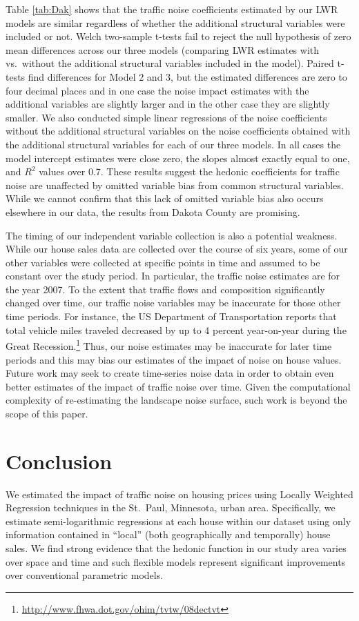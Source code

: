 \documentclass{article}\usepackage[]{graphicx}\usepackage[]{color}
\begin{document}
Table \ref{tab:Dak} shows that the traffic noise coefficients estimated by our LWR models are similar regardless of whether the additional structural variables were included or not. Welch two-sample t-tests fail to reject the null hypothesis of zero mean differences across our three models (comparing LWR estimates with vs.\ without the additional structural variables included in the model). Paired t-tests find differences for Model 2 and 3, but the estimated differences are zero to four decimal places and in one case the noise impact estimates with the additional variables are slightly larger and in the other case they are slightly smaller. We also conducted simple linear regressions of the noise coefficients without the additional structural variables on the noise coefficients obtained with the additional structural variables for each of our three models. In all cases the model intercept estimates were close zero, the slopes almost exactly equal to one, and $R^2$ values over 0.7. These results suggest the hedonic coefficients for traffic noise are unaffected by omitted variable bias from common structural variables. While we cannot confirm that this lack of omitted variable bias also occurs elsewhere in our data, the results from Dakota County are promising. 

The timing of our independent variable collection is also a potential weakness. While our house sales data are collected over the course of six years, some of our other variables were collected at specific points in time and assumed to be constant over the study period. In particular, the traffic noise estimates are for the year 2007. To the extent that traffic flows and composition significantly changed over time, our traffic noise variables may be inaccurate for those other time periods. For instance, the US Department of Transportation reports that total vehicle miles traveled decreased by up to 4 percent year-on-year during the Great Recession.\footnote{\url{http://www.fhwa.dot.gov/ohim/tvtw/08dectvt}} Thus, our noise estimates may be inaccurate for later time periods and this may bias our estimates of the impact of noise on house values. Future work may seek to create time-series noise data in order to obtain even better estimates of the impact of traffic noise over time. Given the computational complexity of re-estimating the landscape noise surface, such work is beyond the scope of this paper.

\section{Conclusion}
We estimated the impact of traffic noise on housing prices using Locally Weighted Regression techniques in the St.\ Paul, Minnesota, urban area. Specifically, we estimate semi-logarithmic regressions at each house within our dataset using only information contained in ``local'' (both geographically and temporally) house sales. We find strong evidence that the hedonic function in our study area varies over space and time and such flexible models represent significant improvements over conventional parametric models. 
\end{document}
